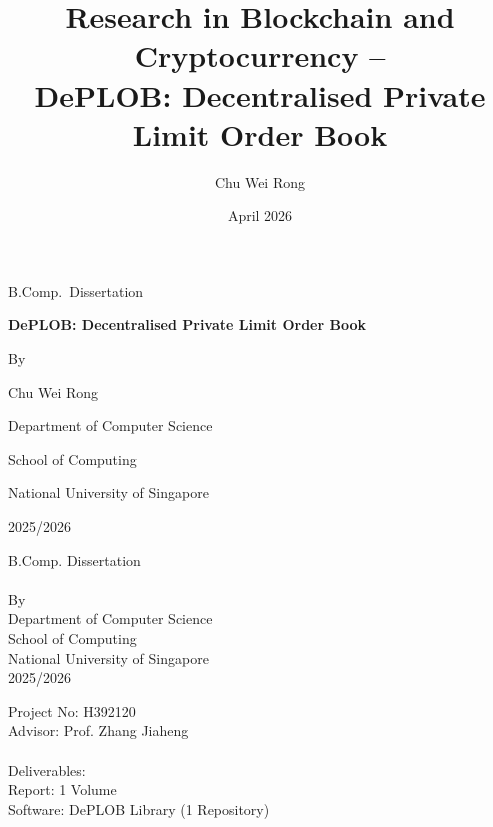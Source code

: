 \documentclass[12pt,a4paper]{article}
\title{Research in Blockchain and Cryptocurrency – \\
DePLOB: Decentralised Private Limit Order Book}
\author{Chu Wei Rong}
\date{April 2026}
\makeatletter
\let\vtitle\@title
\let\vauthor\@author
\newcommand{\customtitle}{%
    \begin{center}
        B.Comp. Dissertation\\[6em]
        \large \textbf{\vtitle}\\[6em]
        \normalsize By
        \vauthor\\[4em]
        Department of Computer Science\\[1em]
        School of Computing\\[1em]
        National University of Singapore\\[1em]
        2025/2026\\[4em]
    \end{center}
    \begin{flushleft}
    Project No: H392120\\
    Advisor: Prof. Zhang Jiaheng\\
    \\
    Deliverables: \\
    \hspace{10mm} Report: 1 Volume \\  
    \hspace{10mm} Software: DePLOB Library (1 Repository) \\
    \end{flushleft}
}
\makeatother
\begin{document}
\begin{titlepage}
  \thispagestyle{empty}
  \begin{center}
    \vspace*{10mm}

    {\large B.Comp.\ Dissertation}

    \vspace{30mm}

    {\Huge \textbf{DePLOB: Decentralised Private Limit Order Book}}

    \vspace{30mm}

    {\large By}

    \vspace{8mm}

    {\large Chu Wei Rong}

    \vfill

    {\large Department of Computer Science}

    \vspace{4mm}

    {\large School of Computing}

    \vspace{4mm}

    {\large National University of Singapore}

    \vspace{8mm}

    {\large 2025/2026}

    \vspace{10mm}
  \end{center}
\end{titlepage}

\begin{titlepage}
\customtitle
\end{titlepage}
\end{document}
